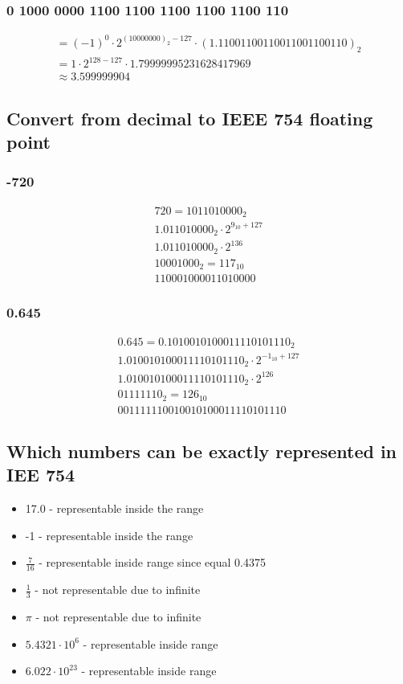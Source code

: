 \documentclass[12pt, a4paper]{article}
\begin{document}
			\subsubsection{0 1000 0000 1100 1100 1100 1100 1100 110}
				\begin{align*}  
				=(-1)^0\cdot 2^{(1000 0000)_2-127}\cdot (1.1100 1100 1100 1100 1100 110)_2\\
				=1\cdot 2^{128-127}\cdot 1.79999995231628417969\\
				\approx 3.599999904
				\end{align*}
		\subsection{Convert from decimal to IEEE 754 floating point}
			\subsubsection{-720}
				\begin{align*}
					720=1011010000_2\\
					1.011010000_2\cdot 2^{9_{10}+127}\\
					1.011010000_2\cdot 2^{136}\\
					10001000_2=117_{10}\\
					1 10001000 011010000
				\end{align*}
			\subsubsection{0.645}
				\begin{align*}
					0.645=0.1010010100011110101110_2\\
					1.010010100011110101110_2\cdot 2^{-1_{10}+127}\\
					1.010010100011110101110_2\cdot 2^{126}\\
					0111 1110_2=126_{10}\\
					0 0111 1110 0100 1010 0011 1101 0111 0
				\end{align*}
		\subsection{Which numbers can be exactly represented in IEE 754}
			\begin{itemize}
				\item 17.0 - representable inside the range
				\item -1 - representable inside the range
				\item $\frac{7}{16}$ - representable inside range since equal 0.4375
				\item $\frac{1}{3}$ - not representable due to infinite
				\item $\pi$ - not representable due to infinite 
				\item $5.4321\cdot 10^6$ - representable inside range
				\item $6.022\cdot 10^{23}$ - representable inside range
			\end{itemize}
\end{document}
